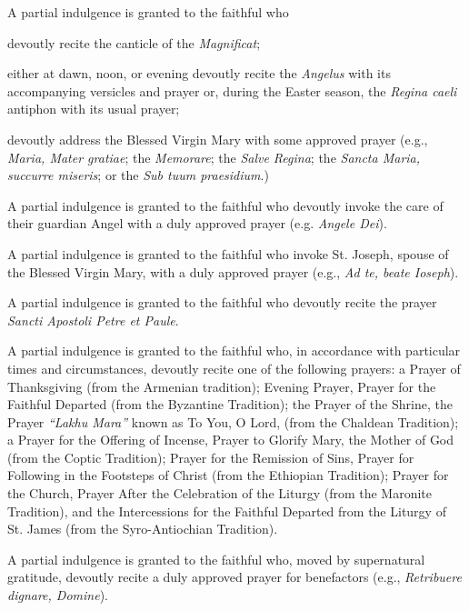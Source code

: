 \documentclass[12pt]{article}
\newcommand{\emphasis}[1]{\emph{#1}}
\newcommand{\emphasis}[1]{\textsl{#1}}
\newcommand{\foreign}[1]{\emphasis{#1}}
\begin{document}
 A partial indulgence is granted to the faithful who

 devoutly recite the canticle of the \foreign{Magnificat};

 either at dawn, noon, or evening devoutly recite the \foreign{Angelus} with its accompanying versicles and prayer or, during the Easter season, the \foreign{Regina caeli} antiphon with its usual prayer;

 devoutly address the Blessed Virgin Mary with some approved prayer (e.g., \foreign{Maria, Mater gratiae}; the \foreign{Memorare}; the \foreign{Salve Regina}; the \foreign{Sancta Maria, succurre miseris}; or the \foreign{Sub tuum praesidium}.)

\hypertarget{grant18}{}
A partial indulgence is granted to the faithful who devoutly invoke the care of their guardian Angel with a duly approved prayer (e.g. \foreign{Angele Dei}).

\hypertarget{grant19}{}
A partial indulgence is granted to the faithful who invoke St. Joseph, spouse of the Blessed Virgin Mary, with a duly approved prayer (e.g., \foreign{Ad te, beate Ioseph}).

\hypertarget{grant20}{}
A partial indulgence is granted to the faithful who devoutly recite the prayer \foreign{Sancti Apostoli Petre et Paule}.

\hypertarget{grant23}{}
 A partial indulgence is granted to the faithful who, in accordance with particular times and circumstances, devoutly recite one of the following prayers: a Prayer of Thanksgiving (from the Armenian tradition); Evening Prayer, Prayer for the Faithful Departed (from the Byzantine Tradition); the Prayer of the Shrine, the Prayer \foreign{``Lakhu Mara''} known as To You, O Lord, (from the Chaldean Tradition); a Prayer for the Offering of Incense, Prayer to Glorify Mary, the Mother of God (from the Coptic Tradition); Prayer for the Remission of Sins, Prayer for Following in the Footsteps of Christ (from the Ethiopian Tradition); Prayer for the Church, Prayer After the Celebration of the Liturgy (from the Maronite Tradition), and the Intercessions for the Faithful Departed from the Liturgy of St. James (from the Syro-Antiochian Tradition).

\hypertarget{grant24}{}
A partial indulgence is granted to the faithful who, moved by supernatural gratitude, devoutly recite a duly approved prayer for benefactors (e.g., \foreign{Retribuere dignare, Domine}).
\end{document}
